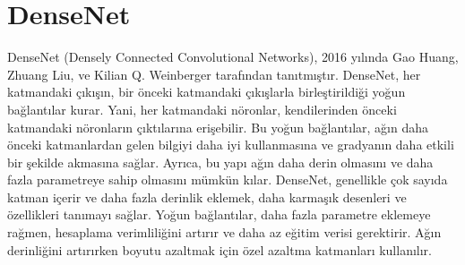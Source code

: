 \section{DenseNet}
DenseNet (Densely Connected Convolutional Networks), 2016 yılında Gao Huang, Zhuang Liu, ve Kilian Q. Weinberger tarafından tanıtmıştır. DenseNet, her katmandaki çıkışın, bir önceki katmandaki çıkışlarla birleştirildiği yoğun bağlantılar kurar. Yani, her katmandaki nöronlar, kendilerinden önceki katmandaki nöronların çıktılarına erişebilir. Bu yoğun bağlantılar, ağın daha önceki katmanlardan gelen bilgiyi daha iyi kullanmasına ve gradyanın daha etkili bir şekilde akmasına sağlar. Ayrıca, bu yapı ağın daha derin olmasını ve daha fazla parametreye sahip olmasını mümkün kılar. DenseNet, genellikle çok sayıda katman içerir ve daha fazla derinlik eklemek, daha karmaşık desenleri ve özellikleri tanımayı sağlar. Yoğun bağlantılar, daha fazla parametre eklemeye rağmen, hesaplama verimliliğini artırır ve daha az eğitim verisi gerektirir. Ağın derinliğini artırırken boyutu azaltmak için özel azaltma katmanları kullanılır.

\newpage